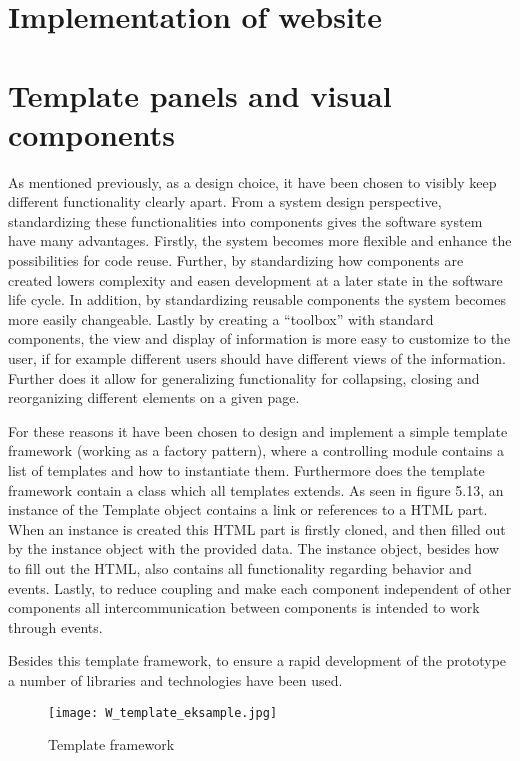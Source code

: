 \section{Implementation of website}
\section*{Template panels and visual components}
As mentioned previously, as a design choice, it have been chosen to visibly keep different functionality clearly apart. From a system design perspective, standardizing these functionalities into components gives the software system have many advantages. Firstly, the system becomes more flexible and enhance the possibilities for code reuse. Further, by standardizing how components are created lowers complexity and easen development at a later state in the software life cycle. In addition, by standardizing reusable components the system becomes more easily changeable. Lastly by creating a “toolbox” with standard components, the view and display of information is more easy to customize to the user, if for example different users should have different views of the information. Further does it allow for generalizing functionality for collapsing, closing and reorganizing different elements on a given page.  

For these reasons it have been chosen to design and implement a simple template framework (working as a factory pattern), where a controlling module contains a list of templates and how to instantiate them. Furthermore does the template framework contain a class which all templates extends. As seen in figure 5.13, an instance of the Template object contains a link or references to a HTML part. When an instance is created this HTML part is firstly cloned, and then filled out by the instance object with the provided data. The instance object, besides how to fill out the HTML, also contains all functionality regarding behavior and events. Lastly, to reduce coupling and make each component independent of other components all intercommunication between components is intended to work through events.

Besides this template framework, to ensure a rapid development of the prototype a number of libraries and technologies have been used.
\begin{figure}
\begin{center}
\texttt{[image: W\_template\_eksample.jpg]}
\end{center}
\caption{Template framework}
\end{figure}
